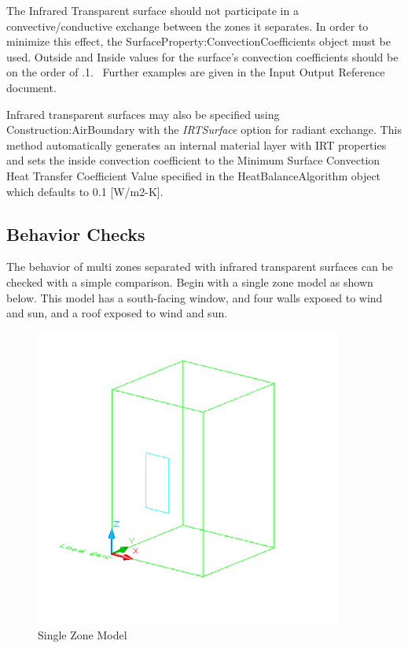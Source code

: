The Infrared Transparent surface should not participate in a convective/conductive exchange between the zones it separates. In order to minimize this effect, the SurfaceProperty:ConvectionCoefficients object must be used. Outside and Inside values for the surface's convection coefficients should be on the order of .1.~ Further examples are given in the Input Output Reference document.

Infrared transparent surfaces may also be specified using Construction:AirBoundary with the \textit{IRTSurface} option for radiant exchange. This method automatically generates an internal material layer with IRT properties and sets the inside convection coefficient to the Minimum Surface Convection Heat Transfer Coefficient Value specified in the HeatBalanceAlgorithm object which defaults to 0.1 [W/m2-K].

\subsection{Behavior Checks}\label{behavior-checks}

The behavior of multi zones separated with infrared transparent surfaces can be checked with a simple comparison. Begin with a single zone model as shown below. This model has a south-facing window, and four walls exposed to wind and sun, and a roof exposed to wind and sun.

\begin{figure}[hbtp] %
\centering
\includegraphics[width=0.9\textwidth, height=0.9\textheight, keepaspectratio=true]{media/image396.png}
\caption{Single Zone Model \protect \label{fig:single-zone-model}}
\end{figure}

